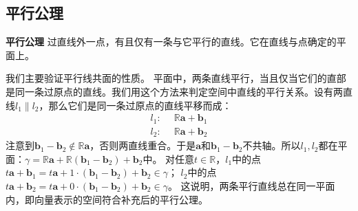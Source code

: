 \documentclass[12pt,UTF8,fontset=none]{ctexbook}
\begin{document}
\begin{appendix}
\section{平行公理}
\begin{po}{\textbf{平行公理}}
    过直线外一点，有且仅有一条与它平行的直线。它在直线与点确定的平面上。
\end{po}
我们主要验证平行线共面的性质。
平面中，两条直线平行，当且仅当它们的直部是同一条过原点的直线。我们用这个方法来判定空间中直线的平行关系。设有两直线$l_1\parallel l_2$，那么它们是同一条过原点的直线平移而成：
\begin{align*}
l_1: & \,\,\, \mathbb{R}\mathbf{a} + \mathbf{b}_1  \\
l_2: & \,\,\, \mathbb{R}\mathbf{a} + \mathbf{b}_2
\end{align*}
注意到$\mathbf{b}_1 - \mathbf{b}_2 \notin \mathbb{R}\mathbf{a}$，否则两直线重合。于是$\mathbf{a}$和$\mathbf{b}_1 - \mathbf{b}_2$不共轴。所以$l_1,l_2$都在平面：$\gamma = \mathbb{R}\mathbf{a} + \mathbb{R}(\mathbf{b}_1 - \mathbf{b}_2) + \mathbf{b}_2$中。
对任意$t\in\mathbb{R}$，$l_1$中的点$t\mathbf{a} + \mathbf{b}_1 = t\mathbf{a} + 1\cdot(\mathbf{b}_1 - \mathbf{b}_2) + \mathbf{b}_2 \in \gamma$；
$l_2$中的点$t\mathbf{a} + \mathbf{b}_2 = t\mathbf{a} + 0\cdot(\mathbf{b}_1 - \mathbf{b}_2) + \mathbf{b}_2 \in \gamma$。
这说明，两条平行直线总在同一平面内，即向量表示的空间符合补充后的平行公理。

\end{appendix}




\end{document}
